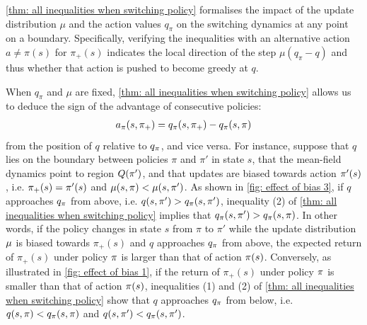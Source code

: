 



\autoref{thm: all inequalities when switching policy} formalises the impact of the update distribution $\mu$ and the action values $q_\pi$ on the switching dynamics at any point on a boundary.
Specifically, verifying the inequalities with an alternative action $a \neq \pi(s)$ for $\pi_+(s)$ indicates the local direction of the step $\mu(q_\pi-q)$ and thus whether that action is pushed to become greedy at $q$.



When $q_\pi$ and $\mu$ are fixed, \autoref{thm: all inequalities when switching policy} allows us to deduce the sign of the advantage of consecutive policies:
\begin{align*}
    a_{\pi}(s, \pi_+) = q_{\pi}(s, \pi_+) - q_{\pi}(s, \pi)
\end{align*}
from the position of $q$ relative to $q_\pi$, and vice versa.
For instance,
suppose that $q$ lies on the boundary between policies $\pi$ and $\pi'$ in state $s$, 
that the mean-field dynamics point to region $Q(\pi')$, and that updates are biased towards action $\pi'(s)$,
i.e. $\pi_+(s) = \pi'(s)$ and $\mu(s, \pi) < \mu(s, \pi')$.
As shown in \autoref{fig: effect of bias 3},
if $q$ approaches $q_\pi$ from above, i.e. $q(s, \pi') > q_{\pi}(s, \pi')$,
inequality (2) of \autoref{thm: all inequalities when switching policy} implies that $q_{\pi}(s, \pi') > q_{\pi}(s, \pi)$.
In other words, if the policy changes in state $s$ from $\pi$ to $\pi'$ while the update distribution $\mu$ is biased towards $\pi_+(s)$ and $q$ approaches $q_\pi$ from above, the expected return of $\pi_+(s)$ under policy $\pi$ is larger than that of action $\pi(s)$.
Conversely, as illustrated in \autoref{fig: effect of bias 1}, if the return of $\pi_+(s)$ under policy $\pi$ is smaller than that of action $\pi(s)$, inequalities (1) and (2) of \autoref{thm: all inequalities when switching policy} show that $q$ approaches $q_\pi$ from below, i.e. $q(s, \pi) < q_{\pi}(s, \pi)$ and $q(s, \pi') < q_{\pi}(s, \pi')$.


